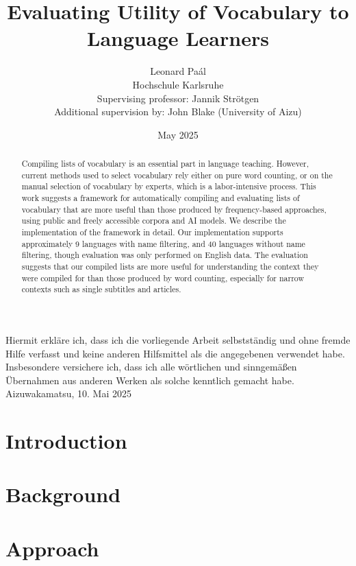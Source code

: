 \documentclass[12pt]{report}
\title{Evaluating Utility of Vocabulary to Language Learners}
\author{Leonard Paál\\Hochschule Karlsruhe\\Supervising professor: Jannik Strötgen\\Additional supervision by: John Blake (University of Aizu)}
\date{May 2025}
\begin{document}
\maketitle

Hiermit erkläre ich, dass ich die vorliegende Arbeit selbstständig und ohne fremde Hilfe verfasst und keine anderen Hilfsmittel als die angegebenen verwendet habe.
Insbesondere versichere ich, dass ich alle wörtlichen und sinngemäßen Übernahmen aus anderen Werken als solche kenntlich gemacht habe.
\\

Aizuwakamatsu, 10. Mai 2025 

\begin{abstract}
	Compiling lists of vocabulary is an essential part in language teaching.
	However, current methods used to select vocabulary rely either on pure word counting, or on the manual selection of vocabulary by experts, which is a labor-intensive process.
	This work suggests a framework for automatically compiling and evaluating lists of vocabulary that are more useful than those produced by frequency-based approaches, using public and freely accessible corpora and AI models.
	We describe the implementation of the framework in detail.
	Our implementation supports approximately 9 languages with name filtering, and 40 languages without name filtering, though evaluation was only performed on English data.
	The evaluation suggests that our compiled lists are more useful for understanding the context they were compiled for than those produced by word counting, especially for narrow contexts such as single subtitles and articles.
\end{abstract}

\clearpage
\tableofcontents
\clearpage

\chapter{Introduction} \label{ch:intro}

\chapter{Background} \label{ch:background}

\chapter{Approach} \label{ch:approach}

\end{document}
